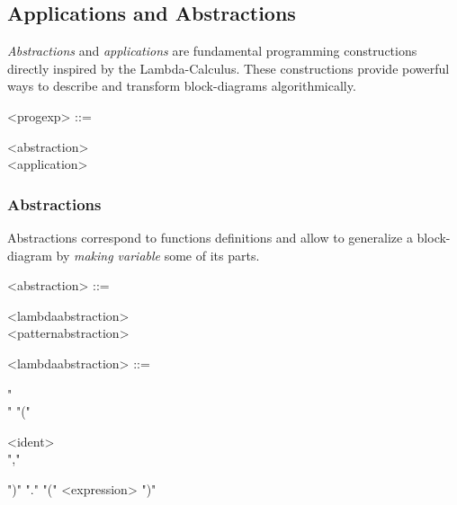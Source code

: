 \documentclass[a4paper,10pt]{book}
\begin{document}


\subsection{Applications and Abstractions}

\textit{Abstractions} and \textit{applications} are fundamental programming constructions directly inspired by the Lambda-Calculus. These constructions provide powerful ways to describe and transform block-diagrams algorithmically.

\begin{grammar}
  <progexp> ::= 
  \begin{syntdiag}
    \begin{stack}
      <abstraction> \\ <application>
    \end{stack}
  \end{syntdiag}
\end{grammar}

\subsubsection{Abstractions}

Abstractions correspond to functions definitions and allow to generalize a block-diagram by \textit{making variable} some of its parts. 

\begin{grammar}
  <abstraction> ::= 
  \begin{syntdiag}
    \begin{stack}
      <lambdaabstraction> \\ <patternabstraction>
    \end{stack}
  \end{syntdiag}
\end{grammar}

\begin{grammar}
  <lambdaabstraction> ::= 
  \begin{syntdiag}
    "\\" "(" 
    \begin{rep}
      <ident> \\ ","
    \end{rep}
    ")" "." "(" <expression> ")"
  \end{syntdiag}
\end{grammar}
\end{document}

